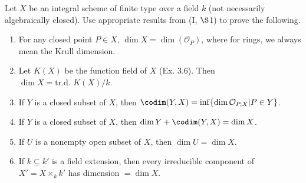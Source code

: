 \begin{exercise}[Dimension]
	Let $X$ be an integral scheme of finite type over a field $k$ (not necessarily algebraically closed). Use appropriate results from (I, $\S $1) to prove the following.
	\begin{enumerate}
		\item For any closed point $P \in X$, $\dim X = \dim(\mathcal{O}_P)$, where for rings, we always mean the Krull dimension. 
		\item Let $K(X)$ be the function field of $X$ (Ex. 3.6). Then $\dim X = \text{tr.d. }K(X)/k$.
		\item If $Y$ is a closed subset of $X$, then $\codim(Y,X) = \inf\{\dim \mathcal{O}_{P,X}|P \in Y\}$.
		\item If $Y$ is a closed subset of $X$, then $\dim Y + \codim(Y,X) = \dim X$.
		\item If $U$ is a nonempty open subset of $X$, then $\dim U = \dim X$.
		\item If $k \subseteq k'$ is a field extension, then every irreducible component of $X' = X \times _k k'$ has dimension $= \dim X$.
	\end{enumerate}
\end{exercise}
